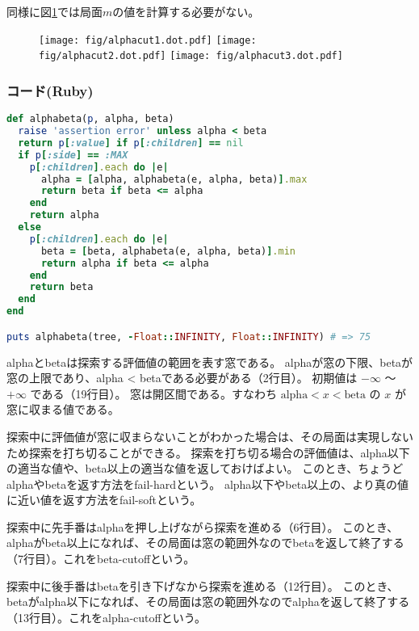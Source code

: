 \documentclass[11pt,a4paper]{ltjsarticle}
\begin{document}
同様に図\ref{alphacut}では局面$m$の値を計算する必要がない。

\begin{figure}[h]
  \centering
  {\texttt{[image: fig/alphacut1.dot.pdf]}}
  {\texttt{[image: fig/alphacut2.dot.pdf]}}
  {\texttt{[image: fig/alphacut3.dot.pdf]}}
  \caption{}
  \label{alphacut}
\end{figure}




\subsubsection{コード(Ruby)}

\begin{lstlisting}[language=ruby,caption=alphabeta.rb]
def alphabeta(p, alpha, beta)
  raise 'assertion error' unless alpha < beta
  return p[:value] if p[:children] == nil
  if p[:side] == :MAX
    p[:children].each do |e|
      alpha = [alpha, alphabeta(e, alpha, beta)].max
      return beta if beta <= alpha
    end
    return alpha
  else
    p[:children].each do |e|
      beta = [beta, alphabeta(e, alpha, beta)].min
      return alpha if beta <= alpha
    end
    return beta
  end
end

puts alphabeta(tree, -Float::INFINITY, Float::INFINITY) # => 75
\end{lstlisting}
  
alphaとbetaは探索する評価値の範囲を表す窓である。
alphaが窓の下限、betaが窓の上限であり、alpha < betaである必要がある（2行目）。
初期値は $-\infty$ 〜 $+\infty$ である（19行目）。
窓は開区間である。すなわち $\mathrm{alpha} < x < \mathrm{beta}$ の $x$ が窓に収まる値である。

探索中に評価値が窓に収まらないことがわかった場合は、その局面は実現しないため探索を打ち切ることができる。
探索を打ち切る場合の評価値は、alpha以下の適当な値や、beta以上の適当な値を返しておけばよい。
このとき、ちょうどalphaやbetaを返す方法をfail-hardという。
alpha以下やbeta以上の、より真の値に近い値を返す方法をfail-softという。

探索中に先手番はalphaを押し上げながら探索を進める（6行目）。
このとき、alphaがbeta以上になれば、その局面は窓の範囲外なのでbetaを返して終了する（7行目）。これをbeta-cutoffという。

探索中に後手番はbetaを引き下げなから探索を進める（12行目）。
このとき、betaがalpha以下になれば、その局面は窓の範囲外なのでalphaを返して終了する（13行目）。これをalpha-cutoffという。
\end{document}
